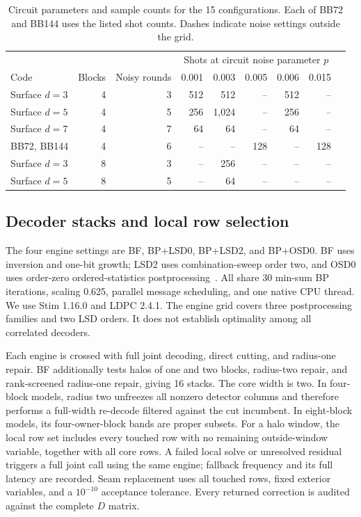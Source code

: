 \begin{table}[t]\centering\small
\caption{Circuit parameters and sample counts for the 15 configurations. Each of BB72 and BB144 uses the listed shot counts. Dashes indicate noise settings outside the grid.}\label{tab:grid}
\begin{tabular}{lrrrrrrrr}\toprule
&&&\multicolumn{5}{c}{Shots at circuit noise parameter $p$}\\
Code&Blocks&Noisy rounds&0.001&0.003&0.005&0.006&0.015\\\midrule
Surface $d=3$&4&3&512&512&--&512&--\\
Surface $d=5$&4&5&256&1,024&--&256&--\\
Surface $d=7$&4&7&64&64&--&64&--\\
BB72, BB144&4&6&--&--&128&--&128\\
Surface $d=3$&8&3&--&256&--&--&--\\
Surface $d=5$&8&5&--&64&--&--&--\\\bottomrule
\end{tabular}\end{table}

\subsection{Decoder stacks and local row selection}
The four engine settings are BF, BP+LSD0, BP+LSD2, and BP+OSD0. BF uses inversion and one-bit growth; LSD2 uses combination-sweep order two, and OSD0 uses order-zero ordered-statistics postprocessing~\cite{lsd,osd,bfdocs,lsddocs,osddocs}. All share 30 min-sum BP iterations, scaling 0.625, parallel message scheduling, and one native CPU thread. We use Stim 1.16.0 and LDPC 2.4.1. The engine grid covers three postprocessing families and two LSD orders. It does not establish optimality among all correlated decoders.

Each engine is crossed with full joint decoding, direct cutting, and radius-one repair. BF additionally tests halos of one and two blocks, radius-two repair, and rank-screened radius-one repair, giving 16 stacks. The core width is two. In four-block models, radius two unfreezes all nonzero detector columns and therefore performs a full-width re-decode filtered against the cut incumbent. In eight-block models, its four-owner-block bands are proper subsets. For a halo window, the local row set includes every touched row with no remaining outside-window variable, together with all core rows. A failed local solve or unresolved residual triggers a full joint call using the same engine; fallback frequency and its full latency are recorded. Seam replacement uses all touched rows, fixed exterior variables, and a $10^{-10}$ acceptance tolerance. Every returned correction is audited against the complete $D$ matrix.


